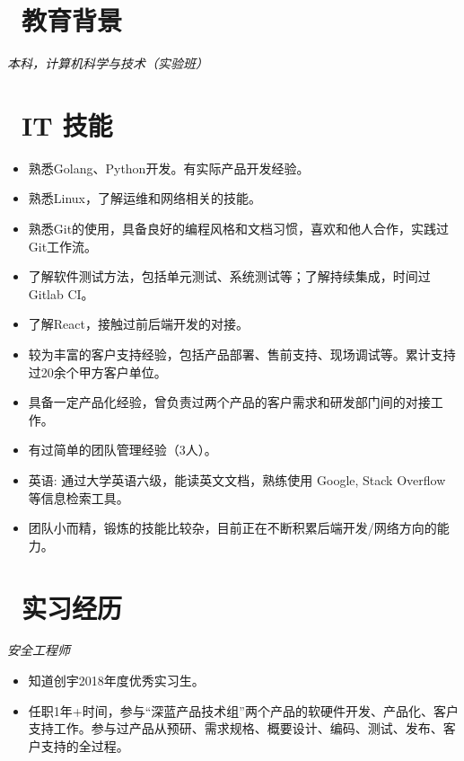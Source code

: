 \documentclass{resume}
\begin{document}


 
\section{\faGraduationCap\  教育背景}
\textit{本科，计算机科学与技术（实验班）}\ 

\section{\faCogs\ IT 技能}
\begin{itemize}[parsep=0.5ex]
  \item 熟悉Golang、Python开发。有实际产品开发经验。
  \item 熟悉Linux，了解运维和网络相关的技能。
  \item 熟悉Git的使用，具备良好的编程风格和文档习惯，喜欢和他人合作，实践过Git工作流。
  \item 了解软件测试方法，包括单元测试、系统测试等；了解持续集成，时间过Gitlab CI。
  \item 了解React，接触过前后端开发的对接。
  \item 较为丰富的客户支持经验，包括产品部署、售前支持、现场调试等。累计支持过20余个甲方客户单位。
  \item 具备一定产品化经验，曾负责过两个产品的客户需求和研发部门间的对接工作。
  \item 有过简单的团队管理经验（3人）。
  \item 英语: 通过大学英语六级，能读英文文档，熟练使用 Google, Stack Overflow 等信息检索工具。
  \item 团队小而精，锻炼的技能比较杂，目前正在不断积累后端开发/网络方向的能力。
\end{itemize}

\section{\faUsers\ 实习经历}
\textit{安全工程师}
\begin{itemize}
  \item 知道创宇2018年度优秀实习生。
  \item 任职1年+时间，参与“深蓝产品技术组”两个产品的软硬件开发、产品化、客户支持工作。参与过产品从预研、需求规格、概要设计、编码、测试、发布、客户支持的全过程。
\end{itemize}
\end{document}
